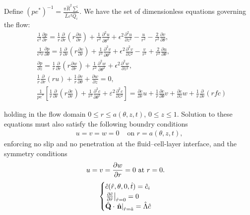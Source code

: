 \documentclass[12pt]{article}
\renewcommand{\(}{\left (}
\renewcommand{\)}{\right )}
\begin{document}
Define $(pe^*)^{-1} = \frac{\pi \hat{R}^{2} \hat{\sum}}{\hat{L} \varepsilon^{2} \hat{Q}_{i}}.$ We have the set of dimensionless equations governing the flow:
 \begin{eqnarray}
 &\frac{1}{\epsilon^{2}} \frac{\partial p}{\partial r}=\frac{1}{r} \frac{\partial}{\partial r}\left(r \frac{\partial u}{\partial r}\right)+\frac{1}{r^{2}} \frac{\partial^{2} u}{\partial \theta^{2}}+\epsilon^{2} \frac{\partial^{2} u}{\partial z^{2}}-\frac{u}{r^{2}}-\frac{2}{r^{2}} \frac{\partial v}{\partial \theta},
 \label{Su} \\
 &\frac{1}{\epsilon^{2} r} \frac{\partial p}{\partial \theta}=\frac{1}{r} \frac{\partial}{\partial r}\left(r \frac{\partial v}{\partial r}\right)+\frac{1}{r^{2}} \frac{\partial^{2} v}{\partial \theta^{2}}+\epsilon^{2} \frac{\partial^{2} v}{\partial z^{2}}-\frac{v}{r^{2}}+\frac{2}{r^{2}} \frac{\partial u}{\partial \theta},
 \label{Sv} \\
 &\frac{\partial p}{\partial z}=\frac{1}{r} \frac{\partial}{\partial r}\left(r \frac{\partial w}{\partial r}\right)+\frac{1}{r^{2}} \frac{\partial^{2} w}{\partial \theta^{2}}+\epsilon^{2} \frac{\partial^{2} w}{\partial z^{2}},
 \label{Sw} \\
 &\frac{1}{r} \frac{\partial}{\partial r}(r u)+\frac{1}{r} \frac{\partial v}{\partial \theta}+\frac{\partial w}{\partial z}=0,
 \label{continuity}\\
 &\frac{1}{pe^{*}}\left[\frac{1}{r} \frac{\partial}{\partial r}\left(r \frac{\partial c}{\partial r}\right)+\frac{1}{r^{2}} \frac{\partial^{2} c}{\partial \theta^{2}}+\varepsilon^{2} \frac{\partial^{2} c}{\partial z^{2}}\right]= \frac{\partial c}{\partial r} u+\frac{1}{{r}}\frac{\partial c}{\partial \theta} v+\frac{\partial c}{\partial z} w+\frac{1}{r} \frac{\partial}{\partial r}(r f c)
 \end{eqnarray}

holding in the flow domain $0\leq r\leq a(\theta,z,t)$, $0\leq z \leq 1$. Solution to these equations must also satisfy the following boundry conditions
\begin{align}
\label{BC:r=a}
u=v=w=0 & \mbox{ on $r=a(\theta,z,t)$,}
\end{align}
enforcing no slip and no penetration at the {\color{black}fluid--cell-layer interface}, and {\color{black}the symmetry conditions}
\begin{align}
\label{BC:r=0}
u=v=\frac{\partial w}{\partial r}=0 & \mbox{ {\color{black}at} $r=0$.}
\end{align}
\begin{equation}
	\begin{cases}
	\hat{c}(\hat{r}, {\theta}, 0, \hat{t})=\hat{c}_{i} \\
	\left.\frac{\partial \hat{c}}{\partial \hat{r}}\right|_{\hat{r}=0}=0\\
	\hat{\bold{Q}} \cdot\left.\hat{\bold{n}}\right|_{\hat{r}=\hat{a}}=\hat{\Lambda} \hat{c}
	\end{cases}
\end{equation}
\end{document}
